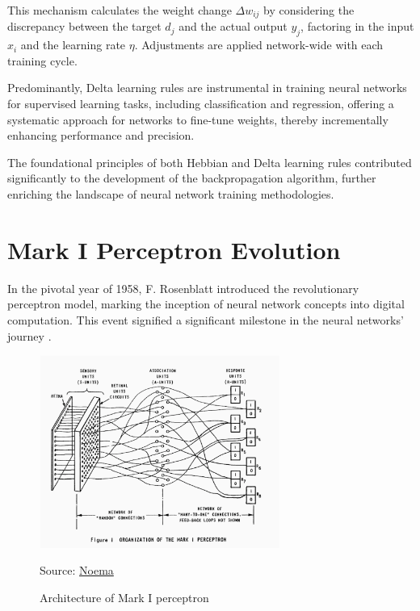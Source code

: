 \documentclass[12pt,a4paper]{report}
\begin{document}
This mechanism calculates the weight change \( \Delta w_{ij} \) by considering the discrepancy between the target \( d_j \) and the actual output \( y_j \), factoring in the input \( x_i \) and the learning rate \( \eta \). Adjustments are applied network-wide with each training cycle.

Predominantly, Delta learning rules are instrumental in training neural networks for supervised learning tasks, including classification and regression, offering a systematic approach for networks to fine-tune weights, thereby incrementally enhancing performance and precision.

The foundational principles of both Hebbian and Delta learning rules contributed significantly to the development of the backpropagation algorithm, further enriching the landscape of neural network training methodologies.

\section{Mark I Perceptron Evolution}

In the pivotal year of 1958, F. Rosenblatt introduced the revolutionary perceptron model, marking the inception of neural network concepts into digital computation. This event signified a significant milestone in the neural networks' journey \cite{Rosenblatt1958PerceptronProbabilisticModel}. 

\begin{figure}[H]
    \centering
    \includegraphics[width=0.7\textwidth]{./data/Architecture of Mark I perceptron.jpg}
    \caption{Architecture of Mark I perceptron}
    \label{fig:my_picture}
    \vspace{1pt} %
    \small{Source: \href{https://www.noemamag.com/blueprints-of-intelligence/}{Noema}}
\end{figure}
\end{document}
